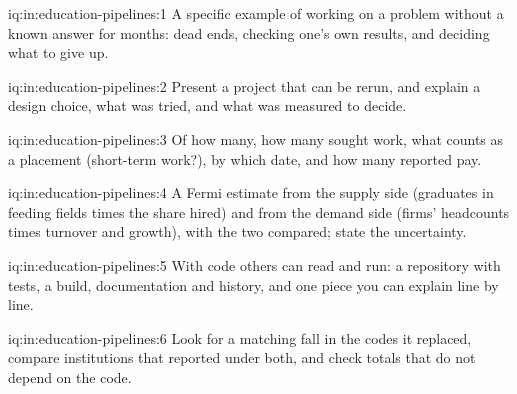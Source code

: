 \begin{solution}{iq:in:education-pipelines:1}
A specific example of working on a problem without a known answer for months: dead ends, checking one's own results,
and deciding what to give up.
\end{solution}

\begin{solution}{iq:in:education-pipelines:2}
Present a project that can be rerun, and explain a design choice, what was tried, and what was measured to decide.
\end{solution}

\begin{solution}{iq:in:education-pipelines:3}
Of how many, how many sought work, what counts as a placement (short-term work?), by which date, and how many reported
pay.
\end{solution}

\begin{solution}{iq:in:education-pipelines:4}
A Fermi estimate from the supply side (graduates in feeding fields times the share hired) and from the demand side
(firms' headcounts times turnover and growth), with the two compared; state the uncertainty.
\end{solution}

\begin{solution}{iq:in:education-pipelines:5}
With code others can read and run: a repository with tests, a build, documentation and history, and one piece you can
explain line by line.
\end{solution}

\begin{solution}{iq:in:education-pipelines:6}
Look for a matching fall in the codes it replaced, compare institutions that reported under both, and check totals that
do not depend on the code.
\end{solution}
